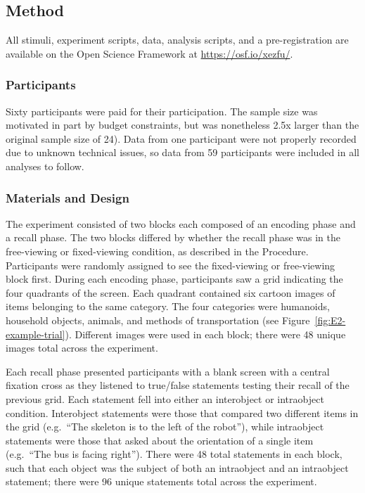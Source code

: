 \documentclass[
  man,floatsintext]{apa6}
\begin{document}
\subsection{Method}\label{method-2}

All stimuli, experiment scripts, data, analysis scripts, and a
pre-registration are available on the Open Science Framework at
\url{https://osf.io/xezfu/}.

\subsubsection{Participants}\label{participants-3}

Sixty participants were paid for their participation.
The sample size was motivated in part by budget constraints, but was
nonetheless 2.5x larger than the original sample size of 24).
Data from one participant were not properly
recorded due to unknown technical issues, so data from 59 participants
were included in all analyses to follow.

\subsubsection{Materials and Design}\label{materials-and-design-2}

The experiment consisted of two blocks each composed of an encoding
phase and a recall phase. The two blocks differed by whether the recall phase was in the free-viewing or fixed-viewing condition, as described in the Procedure. Participants were randomly assigned to see the
fixed-viewing or free-viewing block first.
During each encoding phase, participants saw a
grid indicating the four quadrants of the screen. Each quadrant
contained six cartoon images of items belonging to the same category. The four categories were humanoids, household objects, animals, and
methods of transportation (see Figure~\ref{fig:E2-example-trial}). Different images were used in each block; there were 48 unique images total across the experiment.

Each recall phase presented participants with a blank screen with a central fixation cross as they listened to true/false statements testing their recall of the previous grid. Each statement fell into either an interobject or intraobject
condition. Interobject statements were those that compared two different
items in the grid (e.g.~``The skeleton is to the left of the robot''),
while intraobject statements were those that asked about the orientation
of a single item (e.g.~``The bus is facing right''). There were 48 total
statements in each block, such that each object was the subject of both an intraobject and an intraobject statement; there were 96 unique statements total across the experiment.
\end{document}
